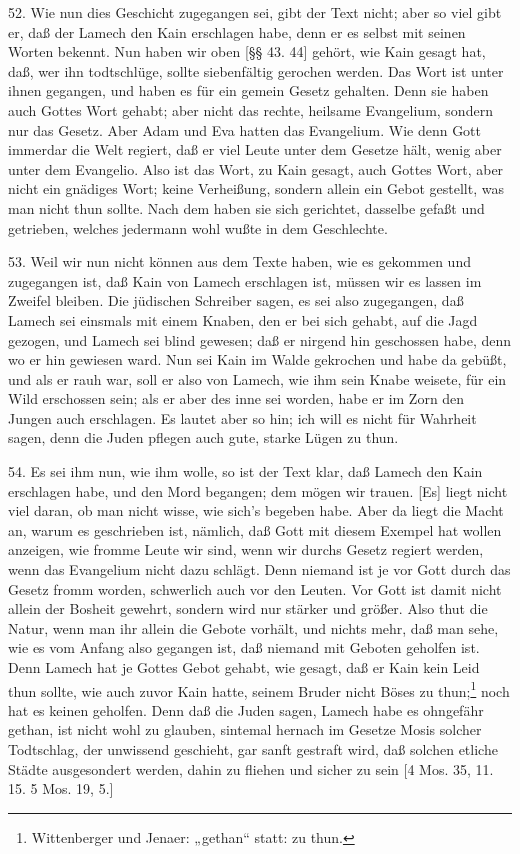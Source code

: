 52. Wie nun dies Geschicht zugegangen sei, gibt der Text nicht; aber so viel gibt er, daß der Lamech den Kain erschlagen habe, denn er es selbst mit seinen Worten bekennt. Nun haben wir oben [§§ 43. 44] gehört, wie Kain gesagt hat, daß, wer ihn todtschlüge, sollte siebenfältig gerochen werden. Das Wort ist unter ihnen gegangen, und haben es für ein gemein Gesetz gehalten. Denn sie haben auch Gottes Wort gehabt; aber nicht das rechte, heilsame Evangelium, sondern nur das Gesetz. Aber Adam und Eva hatten das Evangelium. Wie denn Gott immerdar die Welt regiert, daß er viel Leute unter dem Gesetze hält, wenig aber unter dem Evangelio. Also ist das Wort, zu Kain gesagt, auch Gottes Wort, aber nicht ein gnädiges Wort; keine Verheißung, sondern allein ein Gebot gestellt, was man nicht thun sollte. Nach dem haben sie sich gerichtet, dasselbe gefaßt und getrieben, welches jedermann wohl wußte in dem Geschlechte.

53. Weil wir nun nicht können aus dem Texte haben, wie es gekommen und zugegangen ist, daß Kain von Lamech erschlagen ist, müssen wir es lassen im Zweifel bleiben. Die jüdischen Schreiber sagen, es sei also zugegangen, daß Lamech sei einsmals mit einem Knaben, den er bei sich gehabt, auf die Jagd gezogen, und Lamech
sei blind gewesen; daß er nirgend hin geschossen habe, denn wo er hin gewiesen ward. Nun sei Kain im Walde gekrochen und habe da gebüßt, und als er rauh war, soll er also von Lamech, wie ihm sein Knabe weisete, für ein Wild erschossen sein; als er aber des inne sei worden, habe er im Zorn den Jungen auch erschlagen. Es lautet aber so hin; ich will es nicht für Wahrheit sagen, denn die Juden pflegen auch gute, starke Lügen zu thun.

54. Es sei ihm nun, wie ihm wolle, so ist der Text klar, daß Lamech den Kain erschlagen habe, und den Mord begangen; dem mögen wir trauen. [Es] liegt nicht viel daran, ob man nicht wisse, wie sich’s begeben habe. Aber da liegt die Macht an, warum es geschrieben ist, nämlich, daß Gott mit diesem Exempel hat wollen anzeigen, wie fromme Leute wir sind, wenn wir durchs Gesetz regiert werden, wenn das Evangelium nicht dazu schlägt. Denn niemand ist je vor Gott durch das Gesetz fromm worden, schwerlich auch vor den Leuten. Vor Gott ist damit nicht allein der Bosheit gewehrt, sondern wird nur stärker und größer. Also thut die Natur, wenn man ihr allein die Gebote vorhält, und nichts mehr, daß man sehe, wie es vom Anfang also gegangen ist, daß niemand mit Geboten geholfen ist. Denn Lamech hat je Gottes Gebot gehabt, wie gesagt, daß er Kain kein Leid thun sollte, wie auch zuvor Kain hatte, seinem Bruder nicht Böses zu thun;\footnote{Wittenberger und Jenaer: „gethan“ statt: zu thun.} noch hat es keinen geholfen. Denn daß die Juden sagen, Lamech habe es ohngefähr gethan, ist nicht wohl zu glauben, sintemal hernach im Gesetze Mosis solcher Todtschlag, der unwissend geschieht, gar sanft gestraft wird, daß solchen etliche Städte ausgesondert werden, dahin zu fliehen und sicher zu sein [4 Mos. 35, 11. 15. 5 Mos. 19, 5.]

